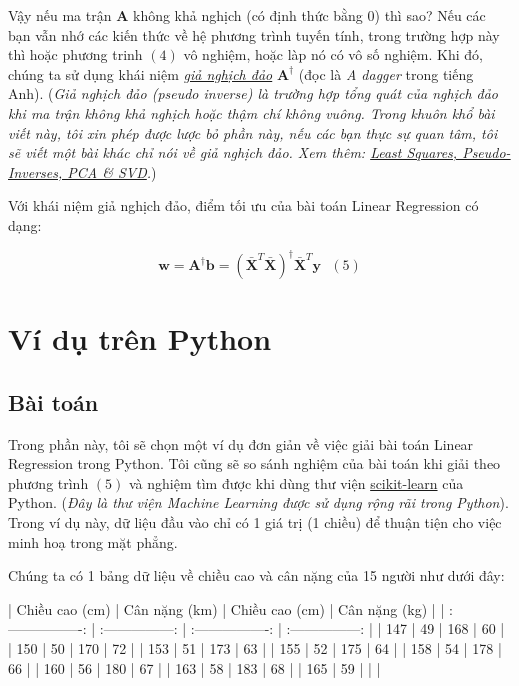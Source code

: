 Vậy nếu ma trận $\mathbf{A} $ không khả nghịch (có định thức bằng 0) thì sao? Nếu các bạn vẫn nhớ các kiến thức về hệ phương trình tuyến tính, trong trường hợp này thì hoặc phương trinh $ (4) $ vô nghiệm, hoặc làp  
nó 
có vô số nghiệm. Khi đó, chúng ta sử dụng khái niệm \href{https://vi.wikipedia.org/wiki/Giả_nghịch_đảo_Moore–Penrose}{\textit{giả nghịch đảo}} $ \mathbf{A}^{\dagger} $ (đọc là \textit{A dagger} trong tiếng Anh). (\textit{Giả nghịch đảo (pseudo inverse) là trường hợp tổng quát của nghịch đảo khi ma trận không khả nghịch hoặc thậm chí không vuông. Trong khuôn khổ bài viết này, tôi xin phép được lược bỏ phần này, nếu các bạn thực sự quan tâm, tôi sẽ viết một bài khác chỉ nói về giả nghịch đảo. Xem thêm: \href{http://www.sci.utah.edu/~gerig/CS6640-F2012/Materials/pseudoinverse-cis61009sl10.pdf}{Least Squares, Pseudo-Inverses, PCA \& SVD}.}) 
 
Với khái niệm giả nghịch đảo, điểm tối ưu của bài toán Linear Regression có dạng: 
 
 
$$ 
\mathbf{w} = \mathbf{A}^{\dagger}\mathbf{b} = (\mathbf{\bar{X}}^T\mathbf{\bar{X}})^{\dagger} \mathbf{\bar{X}}^T\mathbf{y} 
~~~ (5) 
$$ 
 
 
 
 
\section{Ví dụ trên Python}
 
 
\subsection{Bài toán}
 
Trong phần này, tôi sẽ chọn một ví dụ đơn giản về việc giải bài toán Linear Regression trong Python. Tôi cũng sẽ so sánh nghiệm của bài toán khi giải theo phương trình $(5) $ và nghiệm tìm được khi dùng thư viện \href{http://scikit-learn.org/stable/}{scikit-learn} của Python. (\textit{Đây là thư viện Machine Learning được sử dụng rộng rãi trong Python}). Trong ví dụ này, dữ liệu đầu vào chỉ có 1 giá trị (1 chiều) để thuận tiện cho việc minh hoạ trong mặt phẳng.  
 
Chúng ta có 1 bảng dữ liệu về chiều cao và cân nặng của 15 người như dưới đây: 
 
 
| Chiều cao (cm)     | Cân nặng (km)     | Chiều cao (cm)     | Cân nặng (kg)     | 
| :----------------: | :---------------: | :----------------: | :---------------: | 
| 147                | 49                | 168                | 60                | 
| 150                | 50                | 170                | 72                | 
| 153                | 51                | 173                | 63                | 
| 155                | 52                | 175                | 64                | 
| 158                | 54                | 178                | 66                | 
| 160                | 56                | 180                | 67                | 
| 163                | 58                | 183                | 68                | 
| 165                | 59                |                    |                   | 
 

